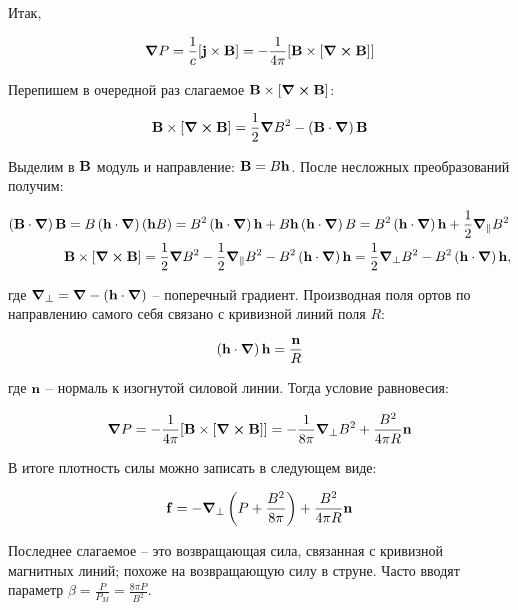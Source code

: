 \documentclass[10pt, a4paper]{article}
\begin{document}
Итак, 

\begin{equation*}
	\grad{P} = \frac{1}{c}[\vb{j}\times\vb{B}] = -\frac{1}{4\pi}[\vb{B}\times[\curl{\vb{B}}]]
\end{equation*}

Перепишем в очередной раз слагаемое $\vb{B}\times[\curl{\vb{B}}]$:

\begin{equation*}
	\vb{B}\times[\curl{\vb{B}}] = \frac{1}{2}\grad{B^2} - \left( \vb{B}\cdot\grad \right)\vb{B}
\end{equation*}

Выделим в $\vb{B}$ модуль и направление: $\vb{B} = B\vb{h}$. После несложных преобразований получим:

\begin{align*}
	\left(\vb{B}\cdot\grad \right)\vb{B}=B\left(\vb{h}\cdot\grad \right)(\vb{h}B) = B^2\left(\vb{h}\cdot\grad \right)\vb{h} &+ B\vb{h}\left(\vb{h}\cdot\grad \right)B = B^2\left(\vb{h}\cdot\grad \right)\vb{h} + \frac{1}{2}\grad_\parallel{B^2} \\
	\vb{B}\times[\curl{\vb{B}}] = \frac{1}{2}\grad{B^2} - \frac{1}{2}\grad_\parallel B^2 &- B^2\left( \vb{h}\cdot\grad \right)\vb{h} = \frac{1}{2}\grad_\perp B^2 - B^2\left( \vb{h}\cdot\grad \right)\vb{h},
\end{align*}

где $\grad_\perp = \grad - \left( \vb{h}\cdot\grad \right)$ -- поперечный градиент. Производная поля ортов по направлению самого себя связано с кривизной линий поля $R$:

\begin{equation*}
	\left( \vb{h}\cdot\grad \right)\vb{h} = \frac{\vb{n}}{R}
\end{equation*}

где $\vb{n}$ -- нормаль к изогнутой силовой линии. Тогда условие равновесия:

\begin{equation*}
	\grad{P} = -\frac{1}{4\pi}[\vb{B}\times[\curl{\vb{B}}]] = 
	-\frac{1}{8\pi}\grad_\perp B^2 + \frac{B^2}{4\pi R}\vb{n}
\end{equation*}

В итоге плотность силы можно записать в следующем виде:

\begin{equation*}
	\vb{f} = -\grad_\perp\left( P + \frac{B^2}{8\pi} \right) + \frac{B^2}{4\pi R}\vb{n}
\end{equation*}

Последнее слагаемое -- это возвращающая сила, связанная с кривизной магнитных линий; похоже на возвращающую силу в струне. Часто вводят параметр $\beta=\frac{P}{P_M}=\frac{8\pi P}{B^2}$.
\end{document}
